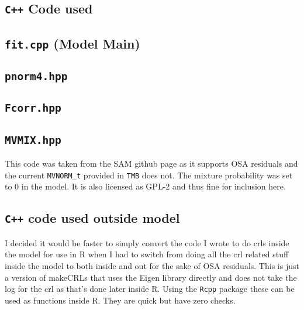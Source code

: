 \documentclass[11pt]{article}\usepackage[]{graphicx}\usepackage[]{color}
\begin{document}
\printbibliography

\begin{appendices}
  \section{\texttt{C++} Code used}\label{Ccode}
  \subsection{\texttt{fit.cpp} (Model Main)}
  
  
  \subsection{\texttt{pnorm4.hpp}}
  
  \subsection{\texttt{Fcorr.hpp}}
  
  \subsection{\texttt{MVMIX.hpp}}
  This code was taken from the SAM github page as it supports OSA residuals and the current \texttt{MVNORM\_t} provided in \texttt{TMB} does not. The mixture probability was set to 0 in the model. It is also licensed as GPL-2 and thus fine for inclusion here.
  
  \subsection{\texttt{C++} code used outside model}
  I decided it would be faster to simply convert the code I wrote to do \acrshort{crl}s inside the model for use in R when I had to switch from doing all the \acrshort{crl} related stuff inside the model to both inside and out for the sake of OSA residuals. This is just a version of makeCRLs that uses the Eigen library directly and does not take the log for the \acrshort{crl} as that's done later inside R. Using the \texttt{Rcpp} package these can be used as functions inside R. They are quick but have zero checks.
  

\end{appendices}
\end{document}
